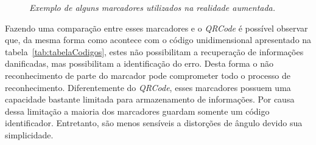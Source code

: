 		\begin{figure}[htb]
			\centering
			\caption{\textit{Exemplo de alguns marcadores utilizados na realidade aumentada.}}
			\label{fig:marcadoresAR} 
		\end{figure}
		
	Fazendo uma comparação entre esses marcadores e o \textit{QRCode} é possível observar que, da mesma
	forma como acontece com o código unidimensional apresentado na tabela~\ref{tab:tabelaCodigos},
	estes não possibilitam a recuperação de informações danificadas, mas possibilitam a identificação do erro. 
	Desta forma o não reconhecimento de parte do marcador pode comprometer todo o processo de reconhecimento. 
	Diferentemente do \textit{QRCode}, esses marcadores possuem uma capacidade bastante limitada para 
	armazenamento de informações. Por causa dessa limitação a maioria dos marcadores guardam somente um código
	identificador. Entretanto, são menos sensíveis a distorções de ângulo devido sua simplicidade. 
	
